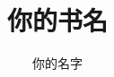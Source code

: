 \documentclass[oneside]{ctexbook}
\begin{document}
\frontmatter
\title{你的书名}
\author{你的名字}
\maketitle

\tableofcontents

\mainmatter




\backmatter
\end{document}
